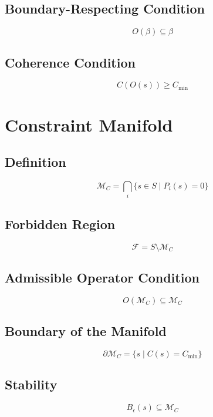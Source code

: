 \documentclass[12pt]{article}
\begin{document}
\subsection{Boundary-Respecting Condition}

\[
O(\beta) \subseteq \beta
\]

\subsection{Coherence Condition}

\[
C(O(s)) \ge C_{\min}
\]

\section{Constraint Manifold}

\subsection{Definition}

\[
\mathcal{M}_C = \bigcap_i \{s \in S \mid P_i(s) = 0\}
\]

\subsection{Forbidden Region}

\[
\mathcal{F} = S \setminus \mathcal{M}_C
\]

\subsection{Admissible Operator Condition}

\[
O(\mathcal{M}_C) \subseteq \mathcal{M}_C
\]

\subsection{Boundary of the Manifold}

\[
\partial \mathcal{M}_C = \{s \mid C(s) = C_{\min}\}
\]

\subsection{Stability}

\[
B_\epsilon(s) \subseteq \mathcal{M}_C
\]
\end{document}
